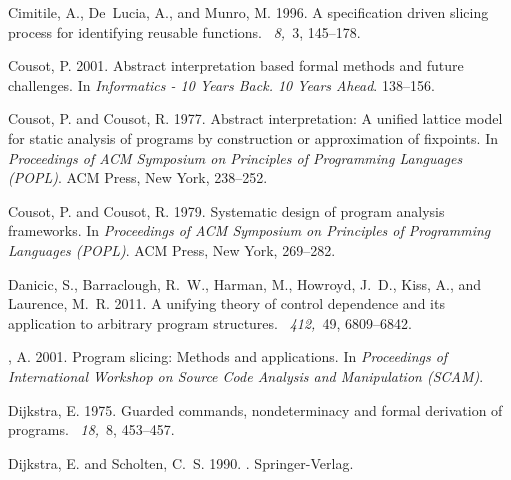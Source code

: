 \documentclass[prodmode,acmtocl]{acmsmall}
\newcommand{\0}{\mbox{\bf 0}}
\begin{document}
\begin{thebibliography}{}
{\sc Cimitile, A.}, {\sc De~Lucia, A.}, {\sc and} {\sc Munro, M.} 1996.
\newblock A specification driven slicing process for identifying reusable
  functions.
~{\em 8,\/}~3, 145--178.

{\sc Cousot, P.} 2001.
\newblock Abstract interpretation based formal methods and future challenges.
\newblock In {\em Informatics - 10 Years Back. 10 Years Ahead}. 138--156.

{\sc Cousot, P.} {\sc and} {\sc Cousot, R.} 1977.
\newblock Abstract interpretation: A unified lattice model for static analysis
  of programs by construction or approximation of fixpoints.
\newblock In {\em Proceedings of ACM Symposium on Principles of Programming
  Languages (POPL)}. ACM Press, New York, 238--252.

{\sc Cousot, P.} {\sc and} {\sc Cousot, R.} 1979.
\newblock Systematic design of program analysis frameworks.
\newblock In {\em Proceedings of ACM Symposium on Principles of Programming
  Languages (POPL)}. ACM Press, New York, 269--282.

{\sc Danicic, S.}, {\sc Barraclough, R.~W.}, {\sc Harman, M.}, {\sc Howroyd,
  J.~D.}, {\sc Kiss, A.}, {\sc and} {\sc Laurence, M.~R.} 2011.
\newblock A unifying theory of control dependence and its application to
  arbitrary program structures.
~{\em 412,\/}~49, 6809--6842.

{, A.} 2001.
\newblock Program slicing: Methods and applications.
\newblock In {\em Proceedings of International Workshop on Source Code Analysis
  and Manipulation (SCAM)}.

{\sc Dijkstra, E.} 1975.
\newblock Guarded commands, nondeterminacy and formal derivation of programs.
~{\em 18,\/}~8, 453--457.

{\sc Dijkstra, E.} {\sc and} {\sc Scholten, C.~S.} 1990.
.
\newblock Springer-Verlag.


\end{thebibliography}
\end{document}
